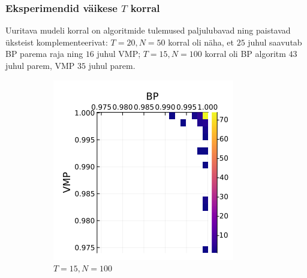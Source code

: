 \subsubsection{Eksperimendid väikese $T$ korral}

Uuritava mudeli korral on algoritmide tulemused paljulubavad ning paistavad üksteist komplementeerivat: $T=20,N=50$ korral oli näha, et $25$ juhul saavutab BP parema raja ning $16$ juhul VMP; $T=15,N=100$ korral oli BP algoritm $43$ juhul parem, VMP $35$ juhul parem.

\begin{figure}
\centering
\begin{subfigure}{.5\textwidth}
  \centering
  \includegraphics[width=1\linewidth]{uniform_dirichlet_percs_std125_t15.png}
  \caption{ $T = 15, N = 100$ }
  \label{fig:sub1}
\end{subfigure}%
\begin{subfigure}{.5\textwidth}
  \centering

\end{subfigure}
\end{figure}
